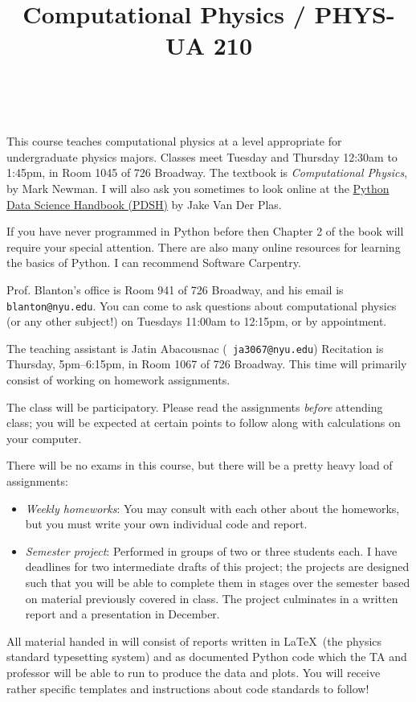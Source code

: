 \documentclass[11pt, preprint]{aastex}
\begin{document}
\title{\bf Computational Physics / PHYS-UA 210}
~
~

\noindent This course teaches computational physics at a level
appropriate for undergraduate physics majors.  Classes meet Tuesday
and Thursday 12:30am to 1:45pm, in Room 1045 of 726 Broadway.  The
textbook is {\it Computational Physics}, by Mark Newman. I will also
ask you sometimes to look online at the
\href{https://jakevdp.github.io/PythonDataScienceHandbook/}{Python Data Science Handbook (PDSH)} by Jake Van Der Plas.

\noindent If you have never programmed in Python before then Chapter 2
of the book will require your special attention. There are also many
online resources for learning the basics of Python. I can recommend
Software Carpentry.

\noindent Prof. Blanton's office is Room 941 of 726 Broadway, and his
email is {\tt blanton@nyu.edu}. You can come to ask questions about
computational physics (or any other subject!) on Tuesdays 11:00am to
12:15pm, or by appointment.

\noindent The teaching assistant is Jatin Abacousnac ({\tt
  ja3067@nyu.edu}) Recitation is Thursday, 5pm--6:15pm, in Room 1067
of 726 Broadway. This time will primarily consist of working on
homework assignments.

\noindent The class will be participatory. Please read the assignments
          {\it before} attending class; you will be expected at
          certain points to follow along with calculations on your
          computer.

\noindent There will be no exams in this course, but there will be a
pretty heavy load of assignments:
\begin{itemize}
\item {\it Weekly homeworks}: You may consult with each other about
  the homeworks, but you must write your own individual code and
  report.
\item {\it Semester project}: Performed in groups of two or three
  students each. I have deadlines for two intermediate drafts of this
  project; the projects are designed such that you will be able to
  complete them in stages over the semester based on material
  previously covered in class. The project culminates in a written
  report and a presentation in December.
\end{itemize}
All material handed in will consist of reports written in \LaTeX\ (the
physics standard typesetting system) and as documented Python code
which the TA and professor will be able to run to produce the data and
plots. You will receive rather specific templates and instructions
about code standards to follow!
\end{document}
